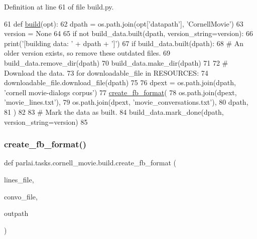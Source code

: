 Definition at line 61 of file build.\+py.


\begin{DoxyCode}
61 \textcolor{keyword}{def }\hyperlink{namespacedialog__babi__feedback_1_1build_a7a9d289f7493a5ded13c4b7f071b6184}{build}(opt):
62     dpath = os.path.join(opt[\textcolor{stringliteral}{'datapath'}], \textcolor{stringliteral}{'CornellMovie'})
63     version = \textcolor{keywordtype}{None}
64 
65     \textcolor{keywordflow}{if} \textcolor{keywordflow}{not} build\_data.built(dpath, version\_string=version):
66         print(\textcolor{stringliteral}{'[building data: '} + dpath + \textcolor{stringliteral}{']'})
67         \textcolor{keywordflow}{if} build\_data.built(dpath):
68             \textcolor{comment}{# An older version exists, so remove these outdated files.}
69             build\_data.remove\_dir(dpath)
70         build\_data.make\_dir(dpath)
71 
72         \textcolor{comment}{# Download the data.}
73         \textcolor{keywordflow}{for} downloadable\_file \textcolor{keywordflow}{in} RESOURCES:
74             downloadable\_file.download\_file(dpath)
75 
76         dpext = os.path.join(dpath, \textcolor{stringliteral}{'cornell movie-dialogs corpus'})
77         \hyperlink{namespaceparlai_1_1tasks_1_1wikiqa_1_1build_a554828702769592403db58c955d1dfe3}{create\_fb\_format}(
78             os.path.join(dpext, \textcolor{stringliteral}{'movie\_lines.txt'}),
79             os.path.join(dpext, \textcolor{stringliteral}{'movie\_conversations.txt'}),
80             dpath,
81         )
82 
83         \textcolor{comment}{# Mark the data as built.}
84         build\_data.mark\_done(dpath, version\_string=version)
85 \end{DoxyCode}
\mbox{\label{namespaceparlai_1_1tasks_1_1cornell__movie_1_1build_ad02efe0879bce0da293ba177112e1af3}} 
\subsubsection{\texorpdfstring{create\+\_\+fb\+\_\+format()}{create\_fb\_format()}}
{\footnotesize\ttfamily def parlai.\+tasks.\+cornell\+\_\+movie.\+build.\+create\+\_\+fb\+\_\+format (\begin{DoxyParamCaption}\item[{}]{lines\+\_\+file,  }\item[{}]{convo\+\_\+file,  }\item[{}]{outpath }\end{DoxyParamCaption})}



